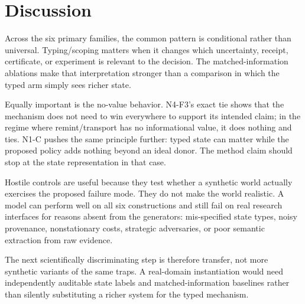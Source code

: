 \section{Discussion}

Across the six primary families, the common pattern is conditional rather than universal. Typing/scoping matters when it changes which uncertainty, receipt, certificate, or experiment is relevant to the decision. The matched-information ablations make that interpretation stronger than a comparison in which the typed arm simply sees richer state.

Equally important is the no-value behavior. N4-F3's exact tie shows that the mechanism does not need to win everywhere to support its intended claim; in the regime where remint/transport has no informational value, it does nothing and ties. N1-C pushes the same principle further: typed state can matter while the proposed policy adds nothing beyond an ideal donor. The method claim should stop at the state representation in that case.

Hostile controls are useful because they test whether a synthetic world actually exercises the proposed failure mode. They do not make the world realistic. A model can perform well on all six constructions and still fail on real research interfaces for reasons absent from the generators: mis-specified state types, noisy provenance, nonstationary costs, strategic adversaries, or poor semantic extraction from raw evidence.

The next scientifically discriminating step is therefore transfer, not more synthetic variants of the same traps. A real-domain instantiation would need independently auditable state labels and matched-information baselines rather than silently substituting a richer system for the typed mechanism.